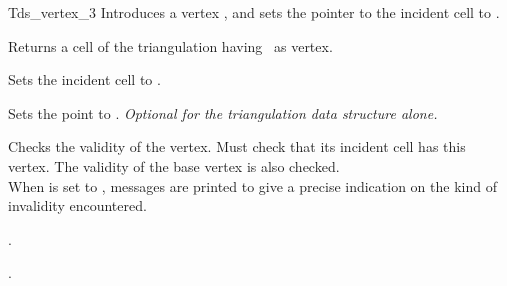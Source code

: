 \begin{ccRefConcept}{Tds_vertex_3}
{Introduces a vertex \ccVar, and sets the pointer to the incident cell
to .}


\ccOperations

\ccAccessFunctions

{Returns a cell of the triangulation having \ccVar\ as vertex.}


{Sets the incident cell to .}

{Sets the point to . {\textit{Optional for the
triangulation data structure alone.}}}

\begin{ccAdvanced}

{Checks the validity of the vertex. Must check that its incident cell
has this vertex. The validity of the base vertex is also checked.\\
When  is set to , messages are printed to give
a precise indication on the kind of invalidity encountered.}
\end{ccAdvanced}

\ccHasModels

.

\ccSeeAlso

.



\end{ccRefConcept}


